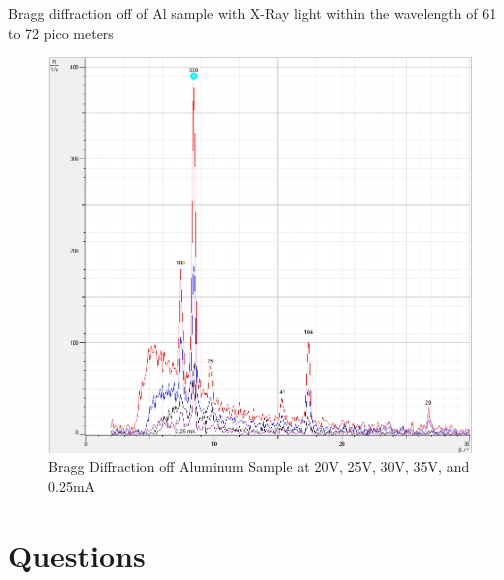 \documentclass{amsart}
\begin{document}
\centering
Bragg diffraction off of Al sample with X-Ray light within the wavelength of 61 to 72 pico meters
\begin{figure}[H]
    \centering
    \includegraphics[width=\textwidth]{Al_annotations.PNG}
    \caption{Bragg Diffraction off Aluminum Sample at 20V, 25V, 30V, 35V, and 0.25mA}
\end{figure}

\section{Questions}
\end{document}
